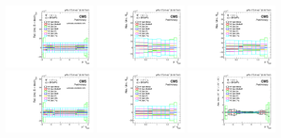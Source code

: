 \begin{figure}[!htbp]
 \begin{center}
  \includegraphics[width=0.29\textwidth]{Figures/WBoson/Analysis/Systematics/Combined/PA/Cross_Section/gr_WToMuMi_PA_Cross_Section_EffTnP_TnP_Syst.pdf}
  \includegraphics[width=0.29\textwidth]{Figures/WBoson/Analysis/Systematics/Combined/PA/ForwardBackward_Ratio/gr_WToMuMi_PA_ForwardBackward_Ratio_EffTnP_TnP_Syst.pdf}
  \includegraphics[width=0.29\textwidth]{Figures/WBoson/Analysis/Systematics/Combined/PA/ForwardBackward_Ratio/gr_WToMuInc_PA_ForwardBackward_Ratio_EffTnP_TnP_Syst.pdf}
  \includegraphics[width=0.29\textwidth]{Figures/WBoson/Analysis/Systematics/Combined/PA/Cross_Section/gr_WToMuPl_PA_Cross_Section_EffTnP_TnP_Syst.pdf}
  \includegraphics[width=0.29\textwidth]{Figures/WBoson/Analysis/Systematics/Combined/PA/ForwardBackward_Ratio/gr_WToMuPl_PA_ForwardBackward_Ratio_EffTnP_TnP_Syst.pdf}
  \includegraphics[width=0.29\textwidth]{Figures/WBoson/Analysis/Systematics/Combined/PA/Charge_Asymmetry/gr_WToMuInc_PA_Charge_Asymmetry_EffTnP_TnP_Syst.pdf}

\end{center}
\end{figure}
